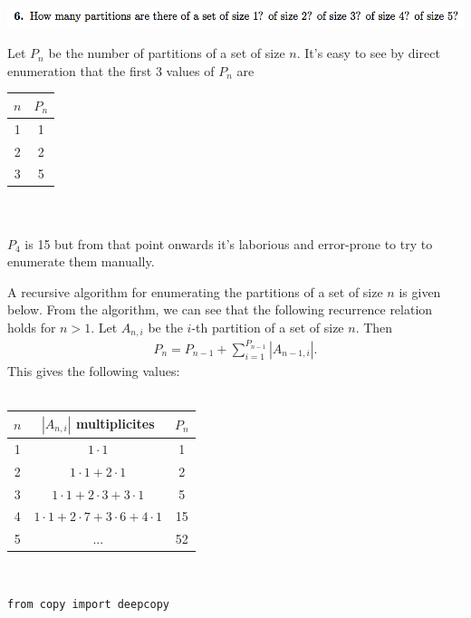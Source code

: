 \documentclass[12pt]{article}
\begin{document}
\subsection*{} %
\includegraphics[width=400pt]{img/iulm-1-6.png}
\begin{mdframed}
  Let $P_n$ be the number of partitions of a set of size $n$. It's easy to see
  by direct enumeration that the first 3 values of $P_n$ are
  \\
  \begin{tabular}{c|c}
    $n$ & $P_n$\\
    \hline
    1 & 1\\
    2 & 2 \\
    3 & 5 \\
  \end{tabular}\\
  \\
  $P_4$ is 15 but from that point onwards it's laborious and error-prone to try
  to enumerate them manually.


  A recursive algorithm for enumerating the partitions of a set of size $n$ is
  given below. From the algorithm, we can see that the following recurrence
  relation holds for $n > 1$. Let $A_{n,i}$ be the $i$-th partition of a set of
  size $n$. Then
  \begin{align*}
    P_n = P_{n-1} + \sum_{i=1}^{P_{n-1}}|A_{n-1,i}|.
  \end{align*}
  This gives the following values:\\\\
  \begin{tabular}{c|c|c}
    $n$ & $|A_{n,i}|$ multiplicites& $P_n$\\
    \hline
    1 & $1 \cdot 1$                                     & 1  \\
    2 & $1 \cdot 1 + 2 \cdot 1$                         & 2  \\
    3 & $1 \cdot 1 + 2 \cdot 3 + 3 \cdot 1$             & 5  \\
    4 & $1 \cdot 1 + 2 \cdot 7 + 3 \cdot 6 + 4 \cdot 1$ & 15 \\
    5 & ...                                             & 52 \\
  \end{tabular}\\
  \newpage
  \begin{verbatim}
from copy import deepcopy


\end{verbatim}
\end{mdframed}
\end{document}
